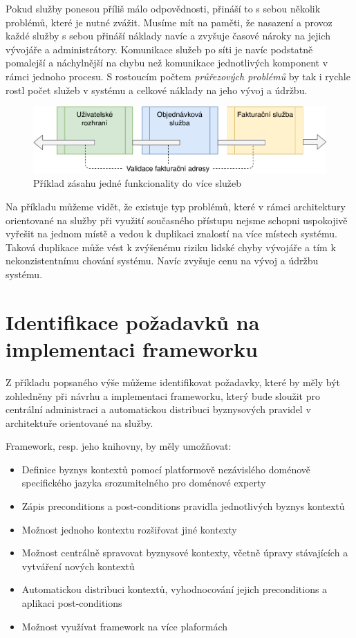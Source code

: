 Pokud služby ponesou příliš málo odpovědnosti,
přináší to s sebou několik problémů, které je nutné zvážit. Musíme mít na paměti, že
nasazení a provoz každé služby s sebou přináší náklady navíc
a zvyšuje časové nároky na jejich vývojáře a administrátory.
Komunikace služeb po síti je navíc podstatně pomalejší a náchylnější na
chybu než komunikace jednotlivých komponent v rámci jednoho procesu.
S rostoucím počtem \textit{průřezových problémů} by tak i rychle rostl
počet služeb v systému a celkové náklady na jeho vývoj a údržbu.

\begin{figure}
    \centering
    \includegraphics[keepaspectratio=true, width=0.8\linewidth]{figures/service-cutting.pdf}
    \caption{Příklad zásahu jedné funkcionality do více služeb}
    \label{fig:service-cutting}
\end{figure}

Na příkladu můžeme vidět, že existuje typ problémů, které v rámci architektury
orientované na služby při využití současného přístupu nejsme schopni uspokojivě
vyřešit na jednom místě a vedou k duplikaci znalostí na více místech systému.
Taková duplikace může vést k zvýšenému riziku lidské chyby vývojáře a tím k
nekonzistentnímu chování systému. Navíc zvyšuje cenu na vývoj a údržbu systému.

\section{Identifikace požadavků na implementaci frameworku}

Z příkladu popsaného výše můžeme identifikovat požadavky, které by měly
být zohledněny při návrhu a implementaci frameworku, který bude sloužit
pro centrální administraci a automatickou distribuci byznysových pravidel
v architektuře orientované na služby.

Framework, resp. jeho knihovny, by měly umožňovat:

\begin{itemize}
    \item{Definice byznys kontextů pomocí platformově nezávislého doménově specifického jazyka srozumitelného pro doménové experty}
    \item{Zápis preconditions a post-conditions pravidla jednotlivých byznys kontextů}
    \item{Možnost jednoho kontextu rozšiřovat jiné kontexty}
    \item{Možnost centrálně spravovat byznysové kontexty, včetně úpravy stávajících a vytváření nových kontextů}
    \item{Automatickou distribuci kontextů, vyhodnocování jejich preconditions a aplikaci post-conditions}
    \item{Možnost využívat framework na více plaformách}
\end{itemize}

